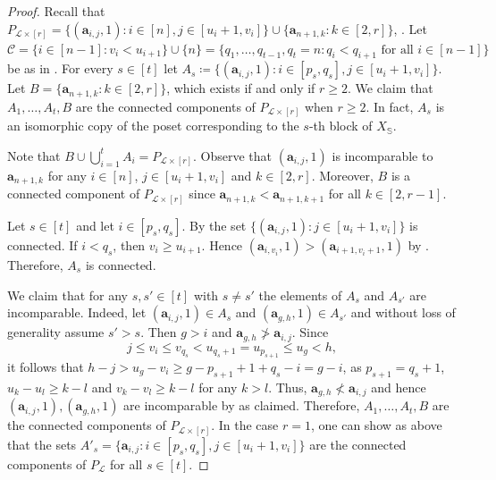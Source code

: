\documentclass[10pt,a4paper]{amsart}
\newcommand\bda{{\bm a}}
\newcommand\calC{\mathcal{C}}
\newcommand\calL{\mathcal{L}}
\newcommand{\Lr}{\ensuremath{\calL\times[r]}}
\begin{document}
\begin{proof}
Recall that  $P_{\Lr} = \{(\bda_{i,j},1): i\in[n],  j\in[u_i+1, v_i]\}\cup \{\bda_{n+1,k}: k\in [2,r]\}$, .  Let $\calC=\{i\in [n-1]: v_i<u_{i+1}\} \cup \{n\}=\{q_1, \ldots, q_{t-1}, q_t=n: q_{i}<q_{i+1} \text{ for all } i\in[n-1]\}$ be as in . For every $s\in [t]$ let $A_s\coloneq\{(\bda_{i,j},1): i\in [p_s,q_s], j\in[u_i+1,v_i]\}$. 
Let $B=\{\bda_{n+1,k}:k\in[2,r]\}$, which exists if and only if $r\ge 2$. We claim that $A_1, \ldots, A_t, B$ are the connected components of $P_{\Lr}$ when $r\ge 2$. 
In fact, $A_s$ is an isomorphic copy of the poset corresponding to the $s$-th block of $X_{\mathbb{S}}$.

Note that $B\cup \bigcup_{i=1}^t A_i=P_{\Lr}$. 
Observe that $(\bda_{i,j},1)$ is incomparable to $\bda_{n+1,k}$ for any $i\in [n]$, $j\in [u_i+1,v_i]$ and $k\in [2,r]$. Moreover, $B$ is  a connected component of $P_{\Lr}$ since $\bda_{n+1,k}<\bda_{n+1,k+1}$ for all $k\in [2,r-1]$.

 Let $s\in [t]$ and let $i\in [p_s,q_s]$. By  the set $\{(\bda_{i,j},1): j\in [u_i+1,v_i]\}$ is connected. If $i<q_s$, then  
$v_i\ge u_{i+1}$. Hence $(\bda_{i,v_i},1)>(\bda_{i+1,v_i+1},1)$ by . Therefore, $A_s$ is connected.


 

We claim that for any $s, s'\in [t]$ with $s\neq s'$ the elements of $A_s$ and $A_{s'}$ are incomparable. Indeed, let $(\bda_{i,j},1)\in A_s$ and $(\bda_{g,h},1)\in A_{s'}$ and without loss of generality assume $s'>s$. Then $g>i$ and $\bda_{g,h} \not> \bda_{i,j}$. Since 
$$j\le v_i\le v_{q_s}<u_{q_s+1}=u_{p_{s+1}} \le u_g<h,$$ 
it follows that $h-j>u_g-v_i\ge g-p_{s+1}+1+q_s-i=g-i$, as $p_{s+1}=q_s+1$, $u_{k}-u_l\ge k-l$ and $v_k-v_l\ge k-l$ for any $k>l$. Thus,  $\bda_{g,h}\not<\bda_{i,j}$ and hence $ (\bda_{i,j},1), (\bda_{g,h},1)$ are incomparable by  as claimed. Therefore, $A_1, \ldots, A_t, B$ are the connected components of $P_{\Lr}$. In the case $r=1$, one can show as above that the sets $A'_s=\{\bda_{i,j}: i\in [p_s, q_s] ,j\in [u_i+1,v_i] \}$ are the connected components of $P_{\calL}$ for all $s\in [t]$.
\end{proof}
\end{document}
